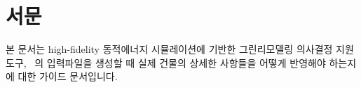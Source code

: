 \documentclass[oneside,openany,a4paper,12pt]{book}
\begin{document}
\pagestyle{plain} 



\section*{서문}
본 문서는 high-fidelity 동적에너지 시뮬레이션에 기반한 그린리모델링 의사결정 지원 도구, \simulator~\releaseversion 의 입력파일을 생성할 때 실제 건물의 상세한 사항들을 어떻게 반영해야 하는지에 대한 가이드 문서입니다.


\tableofcontents       
\listoffigures          
\listoftables          


\clearpage      
{}

\mainmatter






\backmatter



\end{document}
